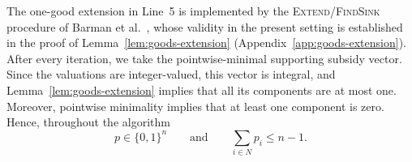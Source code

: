 The one-good extension in Line~5 is implemented by the \textsc{Extend}/\textsc{FindSink} procedure of Barman et al.~\cite{BKNS22}, whose validity in the present setting is established in the proof of Lemma~\ref{lem:goods-extension} (Appendix~\ref{app:goods-extension}). After every iteration, we take the pointwise-minimal supporting subsidy vector. Since the valuations are integer-valued, this vector is integral, and Lemma~\ref{lem:goods-extension} implies that all its components are at most one. Moreover, pointwise minimality implies that at least one component is zero. Hence, throughout the algorithm
\[
p\in\{0,1\}^n
\qquad\text{and}\qquad
\sum_{i\in N}p_i\le n-1.
\]
